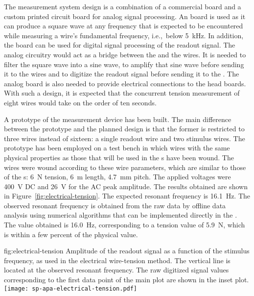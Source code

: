 The measurement system design is a combination of a commercial  board and a custom printed circuit board for analog signal processing. An  board is used as it can produce a square wave at any frequency that is expected to be encountered while measuring a wire's fundamental frequency, i.e.,\ below \SI{5}{kHz}. In addition, the  board can be used for digital signal processing of the readout signal. The analog circuitry would act as a bridge between the  and the  wires. It is needed to filter the square wave into a sine wave, to amplify that sine wave before sending it to the wires and to digitize the readout signal before sending it to the . The analog board is also needed to provide electrical connections to the head boards. With such a design, it is expected that the concurrent tension measurement of eight wires would take on the order of ten seconds.

A prototype of the measurement device has been built. The main difference between the prototype and the planned design is that the former is restricted to three wires instead of sixteen: a single readout wire and two stimulus wires. The prototype has been employed on a test bench in which wires with the same physical properties as those that will be used in the s have been wound. The wires were wound according to these wire parameters, which are similar to those of the s: \SI{6}{N} tension, \SI{6}{m} length, \SI{4.7}{mm} pitch. The applied voltages were \SI{400}{V} DC and \SI{26}{V} for the AC peak amplitude. The results obtained are shown in Figure~\ref{fig:electrical-tension}. The expected resonant frequency is \SI{16.1}{Hz}. The observed resonant frequency is obtained from the raw data by offline data analysis using numerical algorithms that can be implemented directly in the . The value obtained is \SI{16.0}{Hz}, corresponding to a tension value of \SI{5.9}{N}, which is within a few percent of the physical value.

\begin{dunefigure}{fig:electrical-tension}
{Amplitude of the readout signal as a function of the stimulus frequency, as used in the electrical wire-tension method. The vertical line is located at the observed resonant frequency. The raw digitized signal values corresponding to the first data point of the main plot are shown in the inset plot.}
\texttt{[image: sp-apa-electrical-tension.pdf]}
\end{dunefigure}

